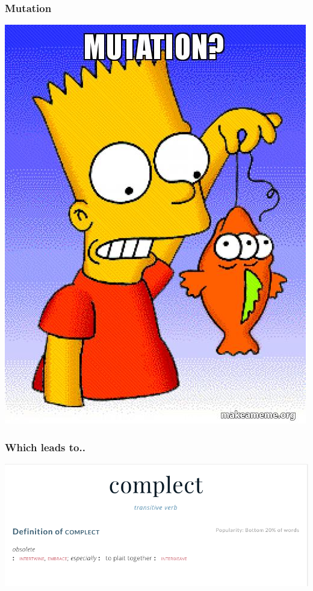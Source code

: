 \documentclass[11pt]{article}
\begin{document}
\subsubsection*{Mutation}
\label{sec:orgheadline12}

\includegraphics[width=.9\linewidth]{./mutation.jpg}

\subsubsection*{Which leads to..}
\label{sec:orgheadline13}

\includegraphics[width=.9\linewidth]{./complect.png}
\end{document}
